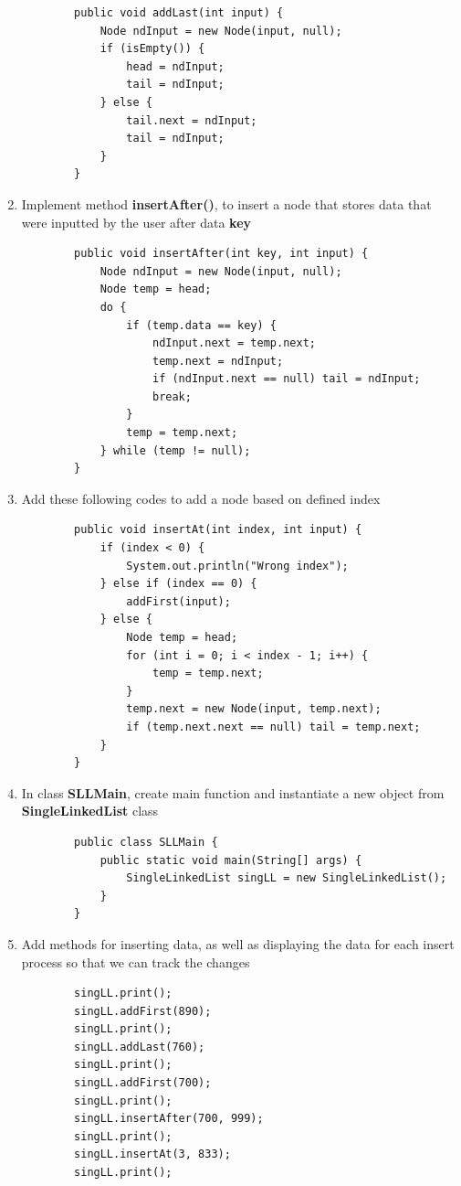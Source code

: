 \documentclass[12pt,titlepage]{article}
\begin{document}
\begin{enumerate}
\begin{verbatim}
        public void addLast(int input) {
            Node ndInput = new Node(input, null);
            if (isEmpty()) {
                head = ndInput;
                tail = ndInput;
            } else {
                tail.next = ndInput;
                tail = ndInput;
            }
        }
    \end{verbatim}
    \item Implement method \textbf{insertAfter()}, to insert a node that stores data that were inputted by the user after data \textbf{key}
    \begin{verbatim}
        public void insertAfter(int key, int input) {
            Node ndInput = new Node(input, null);
            Node temp = head;
            do {
                if (temp.data == key) {
                    ndInput.next = temp.next;
                    temp.next = ndInput;
                    if (ndInput.next == null) tail = ndInput;
                    break;
                }
                temp = temp.next;
            } while (temp != null);
        }
    \end{verbatim}
    \item Add these following codes to add a node based on defined index
    \begin{verbatim}
        public void insertAt(int index, int input) {
            if (index < 0) {
                System.out.println("Wrong index");
            } else if (index == 0) {
                addFirst(input);
            } else {
                Node temp = head;
                for (int i = 0; i < index - 1; i++) {
                    temp = temp.next;
                }
                temp.next = new Node(input, temp.next);
                if (temp.next.next == null) tail = temp.next;
            }
        }
    \end{verbatim}
    \item In class \textbf{SLLMain}, create main function and instantiate a new object from \textbf{SingleLinkedList} class
    \begin{verbatim}
        public class SLLMain {
            public static void main(String[] args) {
                SingleLinkedList singLL = new SingleLinkedList();
            }
        }
    \end{verbatim}
    \item Add methods for inserting data, as well as displaying the data for each insert process so that we can track the changes
    \begin{verbatim}
        singLL.print();
        singLL.addFirst(890);
        singLL.print();
        singLL.addLast(760);
        singLL.print();
        singLL.addFirst(700);
        singLL.print();
        singLL.insertAfter(700, 999);
        singLL.print();
        singLL.insertAt(3, 833);
        singLL.print();
    \end{verbatim}
\end{enumerate}
\end{document}
